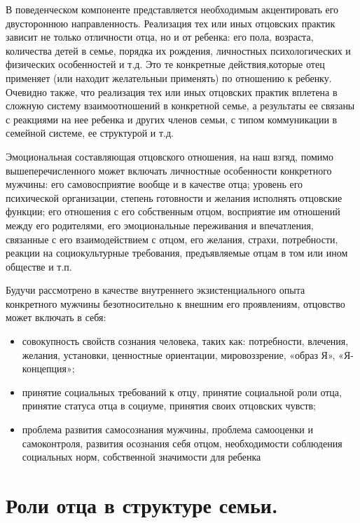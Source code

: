\documentclass{../../common/thesisbyxetex}
\begin{document}
В поведенческом компоненте
представляется необходимым акцентировать его двустороннюю направленность. Реализация тех или иных
отцовских практик зависит не только отличности отца, но и от ребенка: его пола, возраста, количества
детей в семье, порядка их рождения, личностных психологических и физических особенностей и т.д.
Это те конкретные действия,которые отец применяет (или находит желательныи
применять) по отношению к ребенку. Очевидно также, что реализация тех или иных отцовских практик
вплетена в
сложную систему взаимоотношений в конкретной семье, а результаты ее связаны с реакциями на
нее ребенка и других членов семьи, с типом коммуникации в семейной системе, ее структурой и т.д.

Эмоциональная составляющая отцовского отношения, на наш взгяд, помимо вышеперечисленного может
включать личностные особенности конкретного мужчины: его самовосприятие вообще и в качестве отца;
уровень его психической организации, степень готовности и желания исполнять отцовские функции;
его отношения с его собственным отцом, восприятие им отношений между его родителями, его
эмоциональные переживания и впечатления, связанные с его взаимодействием с отцом, его желания,
страхи, потребности, реакции на социокультурные требования, предъявляемые отцам в том или ином
обществе и т.п.

Будучи рассмотрено в качестве внутреннего экзистенциального опыта
конкретного мужчины безотносительно к внешним его проявлениям, отцовство может включать в себя:

\begin{itemize}
	\item  совокупность свойств сознания человека, таких
как: потребности, влечения, желания, установки, ценностные ориентации,
мировоззрение, «образ Я», «Я-концепция»;

\item принятие социальных требований к отцу, принятие социальной роли отца, принятие статуса отца в
социуме, принятия своих отцовских чувств;

\item проблема развития самосознания мужчины, проблема самооценки и самоконтроля, развития осознания
себя отцом, необходимости соблюдения социальных норм, собственной значимости для ребенка
\cite{psyot}
\end{itemize}



\section{Роли отца в структуре семьи.}
\end{document}
